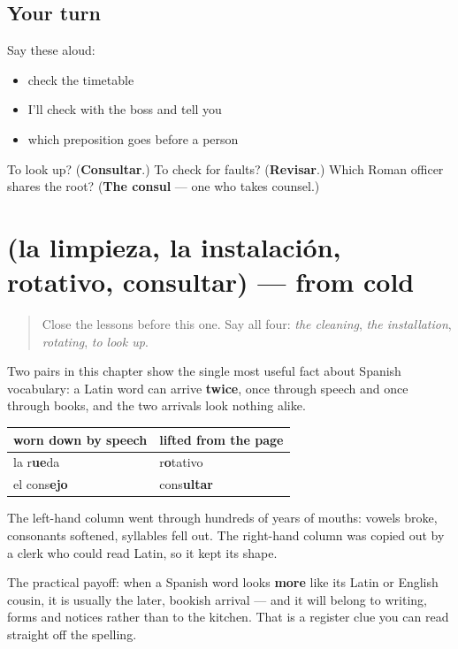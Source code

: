 \subsection*{Your turn}
Say these aloud:

\begin{itemize}
\raggedright
  \item check the timetable
  \item I'll check with the boss and tell you
  \item which preposition goes before a person
\end{itemize}

\begin{tcolorbox}[breakable,colback=teal!4,colframe=teal!35!black,title={Before you move on}]
To look up? (\textbf{Consultar}.) To check for faults? (\textbf{Revisar}.) Which Roman officer shares the root? (\textbf{The consul} — one who takes counsel.)
\end{tcolorbox}
\section[(la limpieza, la instalación …]{(la limpieza, la instalación, rotativo, consultar) — from cold}

\label{lesson:ES-R453-repaso-limpieza}



\begin{quote}
Close the lessons before this one. Say all four: \emph{the cleaning}, \emph{the installation}, \emph{rotating}, \emph{to look up}.
\end{quote}

\begin{grammarlens}[title={Grammar Lens: the same Latin word, twice, differently}]
Two pairs in this chapter show the single most useful fact about Spanish vocabulary: a Latin word can arrive \textbf{twice}, once through speech and once through books, and the two arrivals look nothing alike.

\noindent
\begin{tabularx}{\linewidth}{@{}>{\raggedright\arraybackslash}X>{\raggedright\arraybackslash}X@{}}
\toprule
\textbf{worn down by speech} & \textbf{lifted from the page} \\
\midrule
la r\textbf{ue}da & r\textbf{o}tativo \\
el cons\textbf{ejo} & cons\textbf{ultar} \\
\bottomrule
\end{tabularx}

The left-hand column went through hundreds of years of mouths: vowels broke, consonants softened, syllables fell out. The right-hand column was copied out by a clerk who could read Latin, so it kept its shape.

The practical payoff: when a Spanish word looks \textbf{more} like its Latin or English cousin, it is usually the later, bookish arrival — and it will belong to writing, forms and notices rather than to the kitchen. That is a register clue you can read straight off the spelling.
\end{grammarlens}

